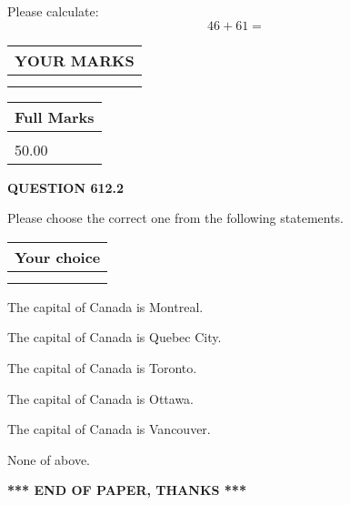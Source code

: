 \documentclass[12pt]{article}
\begin{document}
  
 
Please calculate:
\begin{equation}
46 +  %
61 = \nonumber
\end{equation}
 

 

 
  
\vspace{0.2in}
  
\noindent\begin{tabular}{|l|}
\hline
 YOUR MARKS  \\
\hline
 \\ 
 \\ 
\hline
\end{tabular}
\hspace{0.05in} \begin{tabular}{|l|}
\hline
 Full Marks  \\
\hline
 \\ 
50.00 \\
\hline
\end{tabular}
{\textbf{\Large{QUESTION
612.2 
}}}
  
  
Please choose the correct one from the following statements.
  
  
\noindent\hspace{3.0in} \begin{tabular}{|l|}
\hline
Your choice \\
\hline
 \\ 
 \\ 
\hline
\end{tabular}
  
  
 
 
The capital of Canada is Montreal.
 
 
The capital of Canada is Quebec City.
 
 
The capital of Canada is Toronto.
 
 
The capital of Canada is Ottawa.
 
 
The capital of Canada is Vancouver.
 
 
 None of above.
 
 
   
   
 \vspace{0.2in}
 
   
   
   
   
\vspace{1.0in} 
{\textbf{\large{ *** END OF PAPER, THANKS *** }}} 
   
\end{document}
